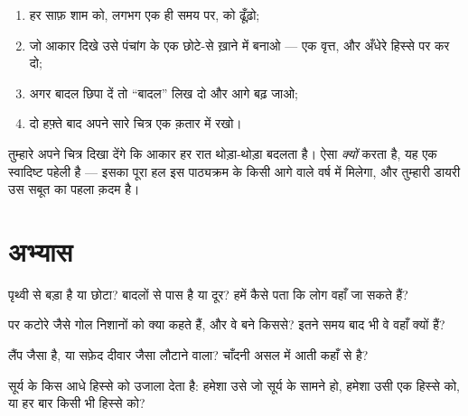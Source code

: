 \begin{method}[चंद्रमा की डायरी रखना]\label{met:g2:moon-in-the-sky:diary}
\begin{enumerate}
  \item हर साफ़ शाम को, लगभग एक ही समय पर,  को ढूँढ़ो;
  \item जो आकार दिखे उसे पंचांग के एक छोटे-से ख़ाने में बनाओ ---
        एक वृत्त, और अँधेरे हिस्से पर  कर दो;
  \item अगर बादल छिपा दें तो ``बादल'' लिख दो और आगे बढ़ जाओ;
  \item दो हफ़्ते बाद अपने सारे चित्र एक क़तार में रखो।
\end{enumerate}
तुम्हारे अपने चित्र दिखा देंगे कि आकार हर रात थोड़ा-थोड़ा बदलता है।
 ऐसा \emph{क्यों} करता है, यह एक स्वादिष्ट पहेली है --- इसका
पूरा हल इस पाठ्यक्रम के किसी आगे वाले वर्ष में मिलेगा, और तुम्हारी
डायरी उस सबूत का पहला क़दम है।
\end{method}

\section{अभ्यास}

\begin{exercise}[$\star$]\label{exo:g2:moon-in-the-sky:1}
 पृथ्वी से बड़ा है या छोटा? बादलों से पास है या दूर? हमें कैसे
पता कि लोग वहाँ जा सकते हैं?
\end{exercise}

\begin{exercise}[$\star$]\label{exo:g2:moon-in-the-sky:2}
 पर कटोरे जैसे गोल निशानों को क्या कहते हैं, और वे बने किससे?
इतने समय बाद भी वे वहाँ क्यों हैं?
\end{exercise}

\begin{exercise}[$\star$]\label{exo:g2:moon-in-the-sky:3}
 लैंप जैसा  है, या सफ़ेद दीवार जैसा 
लौटाने वाला? चाँदनी असल में आती कहाँ से है?
\end{exercise}

\begin{exercise}[$\star$]\label{exo:g2:moon-in-the-sky:4}
सूर्य  के किस आधे हिस्से को उजाला देता है: हमेशा उसे जो सूर्य
के सामने हो, हमेशा उसी एक हिस्से को, या हर बार किसी भी हिस्से को?
\end{exercise}


